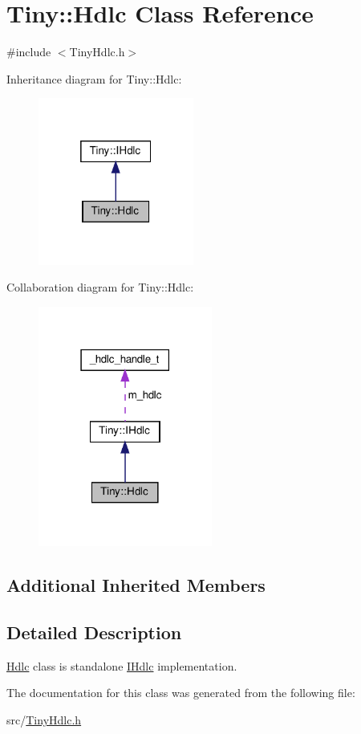 \hypertarget{classTiny_1_1Hdlc}{}\section{Tiny\+:\+:Hdlc Class Reference}
\label{classTiny_1_1Hdlc}


{\ttfamily \#include $<$Tiny\+Hdlc.\+h$>$}



Inheritance diagram for Tiny\+:\+:Hdlc\+:
\nopagebreak
\begin{figure}[H]
\begin{center}
\leavevmode
\includegraphics[width=145pt]{classTiny_1_1Hdlc__inherit__graph}
\end{center}
\end{figure}


Collaboration diagram for Tiny\+:\+:Hdlc\+:
\nopagebreak
\begin{figure}[H]
\begin{center}
\leavevmode
\includegraphics[width=162pt]{classTiny_1_1Hdlc__coll__graph}
\end{center}
\end{figure}
\subsection*{Additional Inherited Members}


\subsection{Detailed Description}
\hyperlink{classTiny_1_1Hdlc}{Hdlc} class is standalone \hyperlink{classTiny_1_1IHdlc}{I\+Hdlc} implementation. 

The documentation for this class was generated from the following file\+:\begin{DoxyCompactItemize}
\item 
src/\hyperlink{TinyHdlc_8h}{Tiny\+Hdlc.\+h}\end{DoxyCompactItemize}
